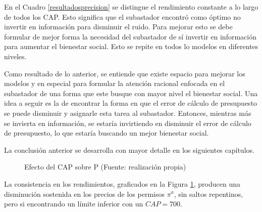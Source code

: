 En el Cuadro \ref{resultadosprecision} se distingue el rendimiento constante a lo largo de todos los CAP. Esto significa que el subastador encontró como óptimo no invertir en información para disminuir el ruido. Para mejorar esto se debe formular de mejor forma la necesidad del subastador de sí invertir en información para aumentar el bienestar social. Esto se repite en todos lo modelos en diferentes niveles.
\vspace{2.5mm}

Como resultado de lo anterior, se entiende que existe espacio para mejorar los modelos y en especial para formular la atención racional enfocada en el subastador de una forma que este busque con mayor nivel el bienestar social. Una idea a seguir es la de encontrar la forma en que el error de cálculo de presupuesto se puede disminuir y asignarle esta tarea al subastador. Entonces, mientras más se invierta en información, se estaría invirtiendo en disminuir el error de cálculo de presupuesto, lo que estaría buscando un mejor bienestar social.
\vspace{2.5mm}

La conclusión anterior se desarrolla con mayor detalle en los siguientes capítulos.
\vspace{2.5mm}


\begin{figure}[H]
\centering
{}
\caption{{\footnotesize Efecto del CAP sobre P (Fuente: realización propia)}}
\label{rendcapMP}
\end{figure}

La consistencia en los rendimientos, graficados en la Figura \ref{rendcapMP}, producen una disminución sostenida en los precios de los permisos $\pi^a$, sin saltos repentinos, pero si encontrando un límite inferior con un $CAP=700$.
\vspace{2.5mm}


